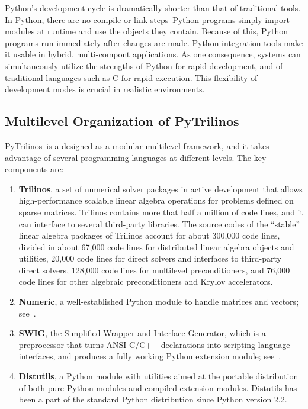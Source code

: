 \documentclass[10pt,relax]{SANDreport}
\newcommand{\PyTrilinos}{{PyTrilinos}}
\newcommand{\note}[1]{\begin{center}\fbox{\bf #1}\end{center}}
\begin{document}
Python's development cycle is dramatically shorter than that of
traditional tools. In Python, there are no compile or link
steps--Python programs simply import modules at runtime and use the
objects they contain. Because of this, Python programs run immediately
after changes are made. Python integration tools make it usable in
hybrid, multi-compont applications. As one consequence, systems can
simultaneously utilize the strengths of Python for rapid development,
and of traditional languages such as C for rapid execution.  This
flexibility of development modes is crucial in realistic environments.

\note{Why no other scripting languages?}

\subsection{Multilevel Organization of PyTrilinos}
\label{sec:multilevel}
  
\PyTrilinos\ is a designed as a modular multilevel framework, and it
takes advantage of several programming languages at different levels.
The key components are:
\begin{enumerate}

\item {\bf Trilinos}, a set of numerical solver packages in active
  development that allows high-performance scalable linear algebra
  operations for problems defined on sparse matrices. Trilinos
  contains more that half a million of code lines, and it can
  interface to several third-party libraries. The source codes of the
  ``stable'' linear algebra packages of Trilinos account for about 300,000
  code lines, divided in about 67,000 code lines for distributed linear
  algebra objects and utilities, 20,000 code lines for direct solvers and
  interfaces to third-party direct solvers, 128,000 code lines for multilevel
  preconditioners, and 76,000 code lines for other algebraic preconditioners
  and Krylov accelerators.

\item {\bf Numeric}, a well-established Python module to handle
  matrices and vectors; see~\cite{numeric}.

\item {\bf SWIG}, the Simplified Wrapper and Interface Generator,
  which is a preprocessor that turns ANSI C/C++ declarations into
  scripting language interfaces, and produces a fully working Python
  extension module; see~\cite{swig}.

\item {\bf Distutils}, a Python module with utilities aimed at the
  portable distribution of both pure Python modules and compiled
  extension modules.  Distutils has been a part of the standard Python
  distribution since Python version 2.2.

\end{enumerate}
\end{document}
